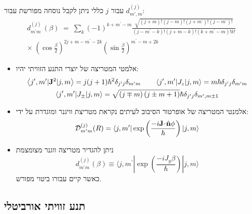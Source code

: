 \documentclass{tstextbook}
\begin{document}
\begin{proposition}
עבור \(j\) כללי ניתן לקבל נוסחה מפורשת עבור \(d^{(j)}_{m',m}\):
$$\begin{gather}d_{m^{\prime}m}^{(j)}\,\left( \beta \right)\;=\;\sum_{k}(-1)^{k+m^{\prime}-m}\frac{\sqrt{(j+m)!(j-m)!\left( j+m^{\prime} \right)!\left( j-m^{\prime} \right)!}}{\left( j-m^{\prime}-k \right)!(j+m-k)!\left( k+m^{\prime}-m \right)!k!}\\ \times\;\left(\cos\frac{\beta}{2}\right)^{2j+m-m^{\prime}-2k}\left(\sin\frac{\beta}{2}\right)^{m^{\prime}-m+2k} 
\end{gather}$$

\end{proposition}
\begin{summary}
  \begin{itemize}
    \item אלמטי המטריצה של יוצרי התנע הזוויתי יהיו:
$$\begin{gather}\left\langle  j^{\prime},m^{\prime}|{\bf J}^{2}|j,m \right\rangle=j(j+1)\hbar^{2}\delta_{j^{\prime}j}\delta_{m^{\prime}m}\qquad  \left\langle  j^{\prime},m^{\prime}|J_{z}|j,m \right\rangle=m\hbar\delta_{j^{\prime}j}\delta_{m^{\prime}m}\\ \left\langle  j^{\prime},m^{\prime}|J_{\pm}|j,m \right\rangle=\sqrt{\left( j\mp m \right)\left( j\pm m+1 \right)}\hbar\delta_{j^{\prime}j}\delta_{m^{\prime},m\pm1} 
\end{gather}$$
    \item אלמנטי המטריצה של אופרטור הסיבוב לעיתים נקראת מטריצת וויגנר ומוגדרת על ידי:
$${\mathcal{D}}_{m^{\prime}m}^{(j)}(R)=\langle j,m^{\prime}|\exp\left(\frac{-i{\bf J}\!\cdot\!{\hat{\bf n}}\phi}{\hbar}\right)|j,m\rangle$$
    \item ניתן להגדיר מטריצה ווגנר מצומצמת
$$d_{m^{\prime}m}^{(j)}(\beta)\equiv\langle j,m^{\prime}|\exp\left(\frac{-i J_{y}\beta}{\hbar}\right)|j,m\rangle$$
כאשר קיים עבורו ביטוי מפורש.
  \end{itemize}
\end{summary}
\subsection{תנע זוויתי אורביטלי}
\end{document}
